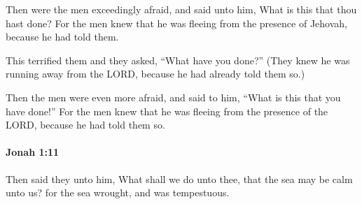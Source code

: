 			\begin{versebox}
					\item[BHS] 
					\item[LXX] 
					\item[ASV] Then were the men exceedingly afraid, and said unto him, What is this that thou hast done? For the men knew that he was fleeing from the presence of Jehovah, because he had told them.
					\item[NIV] This terrified them and they asked, “What have you done?” (They knew he was running away from the LORD, because he had already told them so.)
					\item[NRSV] Then the men were even more afraid, and said to him, “What is this that you have done!” For the men knew that he was fleeing from the presence of the LORD, because he had told them so.
			\end{versebox}

		\paragraph{Jonah 1:11} %
			\label{JONAH-1-11}

			Then said they unto him, What shall we do unto thee, that the sea may be calm unto us? for the sea wrought, and was tempestuous.

